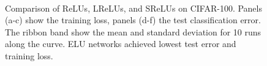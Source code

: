 \documentclass{article}
\begin{document}
\begin{figure}[!ht]
\begin{center}
\\[-2.0ex]
\caption{Comparison of ReLUs, LReLUs, and SReLUs on CIFAR-100.
Panels (a-c) show the training loss, panels (d-f) the test classification
error. The ribbon band show the mean and standard
deviation for 10 runs along the curve. ELU networks achieved lowest test
error and training loss.
\label{fig:resCIFAR100}}
\end{center}
\vspace*{-5pt}
\end{figure}
\end{document}
